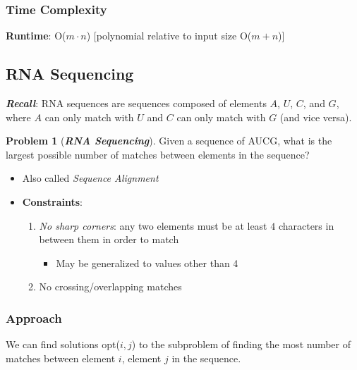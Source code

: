 \documentclass[12pt]{extarticle}
\theoremstyle{definition}
\newtheorem*{problem}{Problem}
\theoremstyle{remark}
\newcommand{\probname}[1]{\noindent \textbf{\textit{#1}}}
\begin{document}
\subsubsection*{Time Complexity}
\textbf{Runtime}: O($m\cdot n$) [polynomial relative to input size O($m+n$)]

\pagebreak
\subsection{RNA Sequencing}
\textbf{\textit{Recall}}: RNA sequences are sequences composed of elements $A$, $U$, $C$, and $G$, where $A$ can only match with $U$ and $C$ can only match with $G$ (and vice versa).

\begin{problem}[\probname{RNA Sequencing}] Given a sequence of AUCG, what is the largest possible number of matches between elements in the sequence? \begin{itemize}
    \item Also called \textit{Sequence Alignment}
    \item \textbf{Constraints}:\begin{enumerate}
        \item \textit{No sharp corners}: any two elements must be at least $4$ characters in between them in order to match \begin{itemize}
            \item May be generalized to values other than 4
        \end{itemize}
        \item No crossing/overlapping matches
    \end{enumerate}
\end{itemize}
\end{problem}

\subsubsection*{Approach}
We can find solutions opt($i,j$) to the subproblem of finding the most number of matches between element $i$, element $j$ in the sequence.
\end{document}
